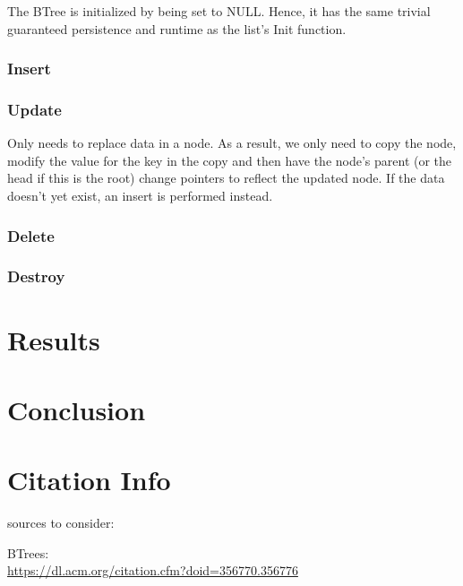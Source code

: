 \documentclass[twocolumn]{article}
\begin{document}
The BTree is initialized by being set to NULL. Hence, it has the same trivial
guaranteed persistence and runtime as the list's Init function.

\subsubsection{Insert}

\subsubsection{Update}

Only needs to replace data in a node. As a result, we only need to copy the
node, modify the value for the key in the copy and then have the node's parent
(or the head if this is the root) change pointers to reflect the updated node.
If the data doesn't yet exist, an insert is performed instead.

\subsubsection{Delete}

\subsubsection{Destroy}

\section{Results}

\section{Conclusion}

\section{Citation Info}


sources to consider:

BTrees:\\
\url{https://dl.acm.org/citation.cfm?doid=356770.356776}
\end{document}

